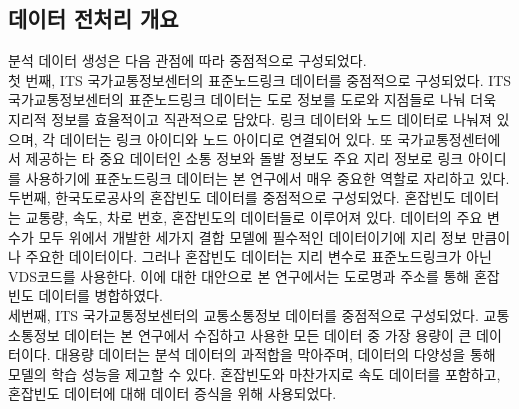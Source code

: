 \documentclass[11pt]{report}
\begin{document}
\subsection{데이터 전처리 개요}
분석 데이터 생성은 다음 관점에 따라 중점적으로 구성되었다. \\
\indent 첫 번째, ITS 국가교통정보센터의 표준노드링크 데이터를 중점적으로 구성되었다. 
ITS 국가교통정보센터의 표준노드링크 데이터는 도로 정보를 도로와 지점들로 나눠 더욱 지리적 정보를 효율적이고 직관적으로 담았다. 
링크 데이터와 노드 데이터로 나눠져 있으며, 각 데이터는 링크 아이디와 노드 아이디로 연결되어 있다. 
또 국가교통정센터에서 제공하는 타 중요 데이터인 소통 정보와 돌발 정보도 주요 지리 정보로 링크 아이디를 사용하기에 표준노드링크 데이터는 본 연구에서 매우 중요한 역할로 자리하고 있다. \\
\indent 두번째, 한국도로공사의 혼잡빈도 데이터를 중점적으로 구성되었다. 
혼잡빈도 데이터는 교통량, 속도, 차로 번호, 혼잡빈도의 데이터들로 이루어져 있다. 
데이터의 주요 변수가 모두 위에서 개발한 세가지 결합 모델에 필수적인 데이터이기에 지리 정보 만큼이나 주요한 데이터이다. 
그러나 혼잡빈도 데이터는 지리 변수로 표준노드링크가 아닌 VDS코드를 사용한다. 
이에 대한 대안으로 본 연구에서는 도로명과 주소를 통해 혼잡빈도 데이터를 병합하였다. \\
\indent 세번째, ITS 국가교통정보센터의 교통소통정보 데이터를 중점적으로 구성되었다. 
교통소통정보 데이터는 본 연구에서 수집하고 사용한 모든 데이터 중 가장 용량이 큰 데이터이다. 
대용량 데이터는 분석 데이터의 과적합을 막아주며, 데이터의 다양성을 통해 모델의 학습 성능을 제고할 수 있다. 
혼잡빈도와 마찬가지로 속도 데이터를 포함하고, 혼잡빈도 데이터에 대해 데이터 증식을 위해 사용되었다. 
\end{document}
